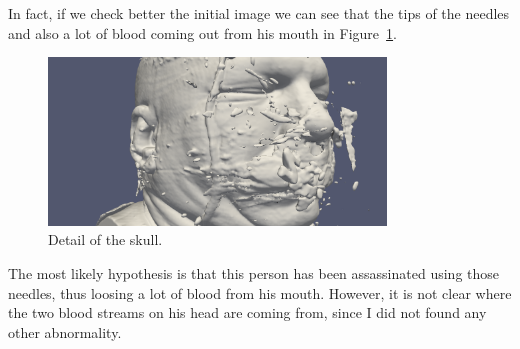 \documentclass[a4paper]{article}
\begin{document}
In fact, if we check better the initial image we can see that the tips of the needles and also a lot of blood coming out from his mouth in Figure~\ref{img:detail}.

\begin{figure}[htbp]
\centering
\includegraphics[width=0.8\textwidth]{res/detail.png}
\caption{Detail of the skull.}
\label{img:detail}
\end{figure}

The most likely hypothesis is that this person has been assassinated using those needles, thus loosing a lot of blood from his mouth. However, it is not clear where the two blood streams on his head are coming from, since I did not found any other abnormality.
\end{document}
